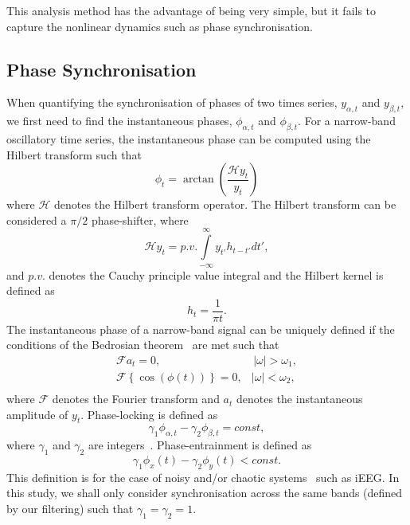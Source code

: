 \documentclass[]{article}
\begin{document}
This analysis method has the advantage of being very simple, but it
fails to capture the nonlinear dynamics such as phase
synchronisation.

\subsection{Phase Synchronisation}

When quantifying the synchronisation of phases of two times series,
$y_{\alpha,t}$ and $y_{\beta,t}$, we first need to find the instantaneous phases,
$\phi_{\alpha,t}$ and $\phi_{\beta,t}$. For a narrow-band oscillatory time series, the instantaneous phase can be computed using the Hilbert transform such that
\begin{equation}
	\phi_t = \arctan\left(\frac{\mathcal{H}y_t}{y_t}\right)
\end{equation}
where $\mathcal H$ denotes the Hilbert transform operator. The Hilbert transform can be considered a $\pi/2$ phase-shifter, where
\begin{equation}\label{eq:HilbertTransform}
\mathcal{H}y_t = p.v.\int\limits_{ - \infty }^\infty {y_{t'}h_{t-t'}} dt',
\end{equation}
and $p.v.$ denotes the Cauchy principle value integral and the Hilbert kernel is defined as
\begin{equation}
	h_t=\frac{1}{\pi t}.
\end{equation} 
The instantaneous phase of a narrow-band signal can be uniquely defined if the conditions of the Bedrosian theorem~\cite{Bedrosian1963} are met such that
\begin{equation}\label{eq:BedrosianCondition}
\begin{array}{*{20}{c}}
   {\mathcal{F}a_t = 0,} & {\,\left| \omega \right| > \omega_1,}  \\
   {\mathcal{F}\left\{ {\cos\left(\phi \left( t \right)\right)} \right\} = 0,} & {\left| \omega \right| < \omega_2,}  \\
\end{array}
\end{equation}
where $\mathcal{F}$ denotes the Fourier transform and $a_t$ denotes the instantaneous amplitude of $y_t$. Phase-locking is defined as
\begin{equation}
\gamma_1\phi_{\alpha,t}-\gamma_2\phi_{\beta,t} = const,
\end{equation}
where $\gamma_1$ and $\gamma_2$ are integers~\cite{Huygens1673}. Phase-entrainment is defined as
\begin{equation}
\gamma_1\phi_x(t)-\gamma_2\phi_y(t) < const.
\end{equation}
This definition is for the case of noisy and/or chaotic
systems~\cite{Rosenblum1996} such as iEEG. In this study, we shall only consider synchronisation across the same bands (defined by our filtering) such that $\gamma_1=\gamma_2=1$.
\end{document}
